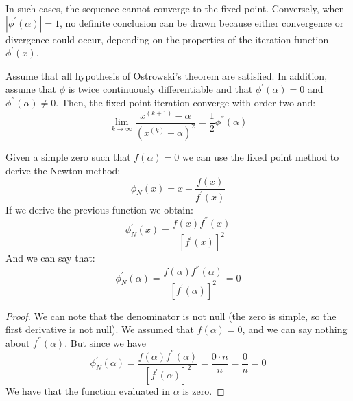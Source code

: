 \documentclass[12pt, a4paper]{report}
\begin{document}
    In such cases, the sequence cannot converge to the fixed point.
    Conversely, when $\left\lvert\phi^{'}(\alpha)\right\rvert=1$, no definite conclusion can be drawn because either convergence or divergence could occur, depending on the properties of the iteration function $\phi^{'}(x)$. 
    \begin{proposition}
        Assume that all hypothesis of Ostrowski's theorem are satisfied. In addition, assume that $\phi$ is twice continuously differentiable and that $\phi^{'}(\alpha)=0$ and 
        $\phi^{''}(\alpha) \neq 0$. Then, the fixed point iteration converge with order two and:
        \[\lim_{k \rightarrow \infty}\dfrac{x^{(k+1)}-\alpha}{\left(x^{(k)}-\alpha\right)^2}=\dfrac{1}{2}\phi^{''}(\alpha)\]
    \end{proposition}
    Given a simple zero such that $f(\alpha)=0$ we can use the fixed point method to derive the Newton method: 
    \[\phi_N(x)=x-\dfrac{f(x)}{f^{'}(x)}\]
    If we derive the previous function we obtain:
    \[\phi^{'}_N(x)=\dfrac{f(x)f^{''}(x)}{\left[f^{'}(x)\right]^2}\]
    And we can say that: 
    \[\phi^{'}_N(\alpha)=\dfrac{f(\alpha)f^{''}(\alpha)}{\left[f^{'}(\alpha)\right]^2}=0\]
    \begin{proof}
        We can note that the denominator is not null (the zero is simple, so the first derivative is not null). We assumed that $f(\alpha)=0$, and we can say nothing about 
        $f^{''}(\alpha)$. But since we have 
        \[\phi^{'}_N(\alpha)=\dfrac{f(\alpha)f^{''}(\alpha)}{\left[f^{'}(\alpha)\right]^2}=\dfrac{0 \cdot n}{n}=\dfrac{0}{n}=0\]
        We have that the function evaluated in $\alpha$ is zero. 
    \end{proof}
\end{document}
